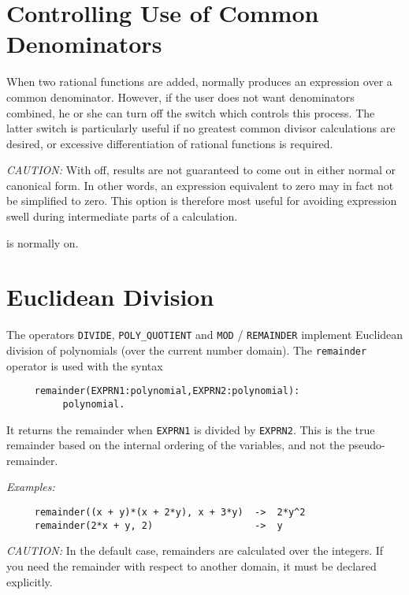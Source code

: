 \section{Controlling Use of Common Denominators}
\hypertarget{switch:MCD}{}
When two rational functions are added, {\REDUCE} normally produces an
expression over a common denominator. However, if the user does not want
denominators combined, he or she can turn off the switch 
 which controls this process.  The latter switch is
particularly useful if no greatest common divisor calculations are
desired, or excessive differentiation of rational functions is required.

\textit{CAUTION:}  With  off, results are not guaranteed to come out in
either normal or canonical form.  In other words, an expression equivalent
to zero may in fact not be simplified to zero.  This option is therefore
most useful for avoiding expression swell during intermediate parts of a
calculation.

 is normally on.

\section{Euclidean Division}
\hypertarget{operator:DIVIDE}{}
\hypertarget{operator:POLY_QUOTIENT}{}
\hypertarget{operator:REMAINDER}{}
\hypertarget{operator:MOD}{}

The operators \texttt{DIVIDE}, \texttt{POLY\_QUOTIENT} and
\texttt{MOD} / \texttt{REMAINDER} implement Euclidean division of
polynomials (over the current number domain).
The \texttt{remainder} operator is used with the syntax
\begin{verbatim}
     remainder(EXPRN1:polynomial,EXPRN2:polynomial):
          polynomial.
\end{verbatim}
It returns the remainder when \texttt{EXPRN1} is divided by \texttt{EXPRN2}.  This
is the true remainder based on the internal ordering of the variables, and
not the pseudo-remainder. 

\textit{Examples:}
\begin{verbatim}
     remainder((x + y)*(x + 2*y), x + 3*y)  ->  2*y^2
     remainder(2*x + y, 2)                  ->  y
\end{verbatim}

\textit{CAUTION:} In the default case, remainders are calculated over the
integers.  If you need the remainder with respect to another domain, it
must be declared explicitly.

